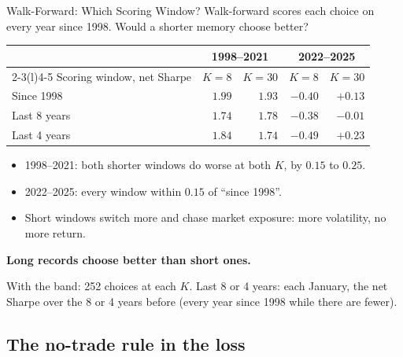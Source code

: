 \documentclass[11pt]{beamer}
\newcommand{\src}[1]{%
  \par\vfill
  {\fontsize{6.4}{7.6}\selectfont\color{Muted}#1\par}
}
\newcommand{\claim}[1]{%
  \par{\color{SBred}\bfseries #1\par}
}
\renewcommand{\src}[1]{%
  \par\vfill
  {\fontsize{6.4}{7.6}\selectfont#1\par}
}
\begin{document}
\begin{frame}{Walk-Forward: Which Scoring Window?}
Walk-forward scores each choice on every year since 1998. Would a shorter memory choose better?
\begin{center}
\begin{tabular}{@{}lrrrr@{}}
\toprule
 & \multicolumn{2}{c}{1998--2021} & \multicolumn{2}{c}{2022--2025}\\
\cmidrule(lr){2-3}\cmidrule(l){4-5}
Scoring window, net Sharpe & $K=8$ & $K=30$ & $K=8$ & $K=30$\\
\midrule
Since 1998 & $\mathbf{1.99}$ & $\mathbf{1.93}$ & $-0.40$ & $+0.13$\\
Last 8 years & $1.74$ & $1.78$ & $-0.38$ & $-0.01$\\
Last 4 years & $1.84$ & $1.74$ & $-0.49$ & $+0.23$\\
\bottomrule
\end{tabular}
\end{center}
\begin{itemize}
\item 1998--2021: both shorter windows do worse at both $K$, by $0.15$ to $0.25$.
\item 2022--2025: every window within $0.15$ of ``since 1998''.
\item Short windows switch more and chase market exposure: more volatility, no more return.
\end{itemize}
\claim{Long records choose better than short ones.}
\src{With the band: 252 choices at each $K$. Last 8 or 4 years: each January, the net Sharpe over the 8 or 4 years before
(every year since 1998 while there are fewer).}
\end{frame}

\subsection{The no-trade rule in the loss}
\end{document}
